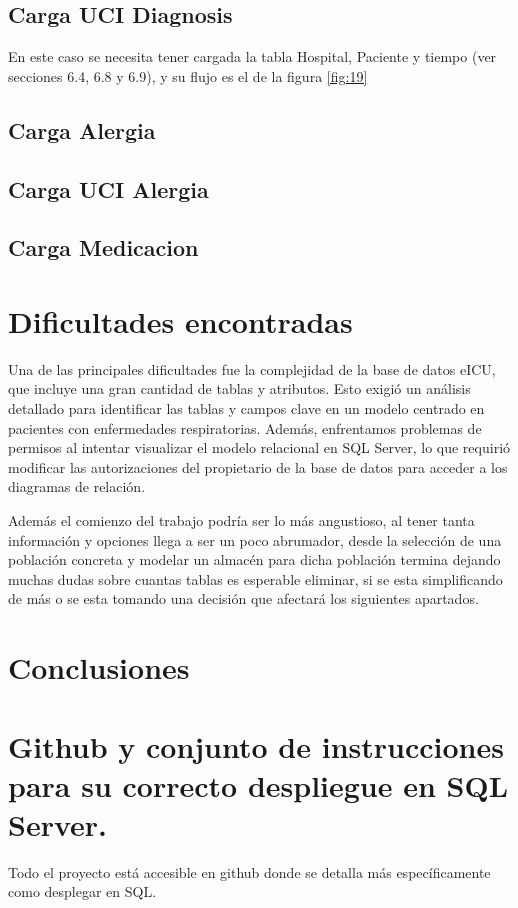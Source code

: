 \documentclass[12pt, a4paper, twoside]{article}
\begin{document}
	
	
	\subsection{Carga UCI Diagnosis}
	
	En este caso se necesita tener cargada la tabla Hospital, Paciente y tiempo (ver secciones 6.4, 6.8 y 6.9), y su flujo es el de la figura \ref{fig:19}
	
	\subsection{Carga Alergia}
	
	\subsection{Carga UCI Alergia}
	
	\subsection{Carga Medicacion}
	
	\section{Dificultades encontradas}
	
	
	Una de las principales dificultades fue la complejidad de la base de datos eICU, que incluye una gran cantidad de tablas y atributos. Esto exigió un análisis detallado para identificar las tablas y campos clave en un modelo centrado en pacientes con enfermedades respiratorias. Además, enfrentamos problemas de permisos al intentar visualizar el modelo relacional en SQL Server, lo que requirió modificar las autorizaciones del propietario de la base de datos para acceder a los diagramas de relación.
	
	Además el comienzo del trabajo podría ser lo más angustioso, al tener tanta información y opciones llega a ser un poco abrumador, desde la selección de una población concreta y modelar un almacén para dicha población termina dejando muchas dudas sobre cuantas tablas es esperable eliminar, si se esta simplificando de más o se esta tomando una decisión que afectará los siguientes apartados. 
	
	\section{Conclusiones}
	
	


	\section{Github y conjunto de instrucciones para su correcto despliegue en SQL Server.}

	Todo el proyecto está accesible en github \cite{depab2024} donde se detalla más específicamente como desplegar en SQL.
	\printbibliography
	
	
	
	
\end{document}
